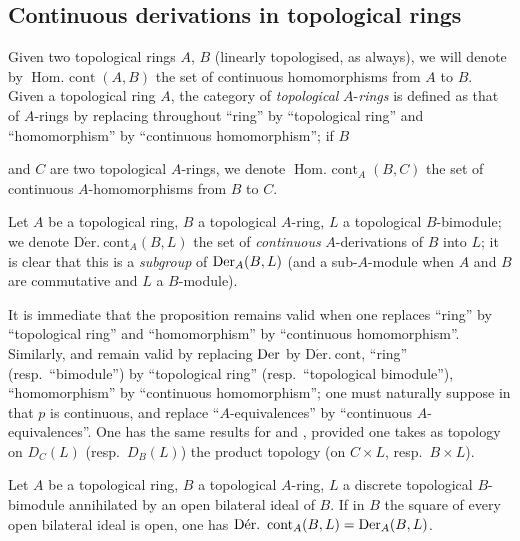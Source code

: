 \subsection{Continuous derivations in topological rings}
\label{subsection:0.20.3}

\begin{env}[20.3.1]
\label{0.20.3.1}
Given two topological rings $A$, $B$ (linearly topologised, as always), we will denote by $\operatorname{Hom.\ cont}(A,B)$ the set of continuous homomorphisms from $A$ to $B$.
Given a topological ring $A$, the category of \emph{topological} $A$-\emph{rings} is defined as that of $A$-rings  by replacing throughout ``ring'' by ``topological ring'' and ``homomorphism'' by ``continuous homomorphism''; if $B$

and $C$ are two topological $A$-rings, we denote $\operatorname{Hom.\ cont}_A(B,C)$ the set of continuous $A$-homomorphisms from $B$ to $C$.

Let $A$ be a topological ring, $B$ a topological $A$-ring, $L$ a topological $B$-bimodule; we denote $\operatorname{D\acute{e}r.\ cont}_A(B,L)$ the set of \emph{continuous} $A$-derivations of $B$ into $L$; it is clear that this is a \emph{subgroup} of $\operatorname{Der}_A(B,L)$ (and a sub-$A$-module when $A$ and $B$ are commutative and $L$ a $B$-module).
\end{env}

\begin{env}[20.3.2]
\label{0.20.3.2}
It is immediate that the proposition  remains valid when one replaces ``ring'' by ``topological ring'' and ``homomorphism'' by ``continuous homomorphism''.
Similarly,  and  remain valid by replacing $\operatorname{Der}$ by $\operatorname{D\acute{e}r.\ cont}$, ``ring'' (resp.\ ``bimodule'') by ``topological ring'' (resp.\ ``topological bimodule''), ``homomorphism'' by ``continuous homomorphism''; one must naturally suppose in  that $p$ is continuous, and replace ``$A$-equivalences'' by ``continuous $A$-equivalences''.
One has the same results for  and , provided one takes as topology on $D_C(L)$ (resp.\ $D_B(L)$) the product topology (on $C\times L$, resp.\ $B\times L$).
\end{env}

\begin{proposition}[20.3.3]
\label{0.20.3.3}
Let $A$ be a topological ring, $B$ a topological $A$-ring, $L$ a discrete topological $B$-bimodule annihilated by an open bilateral ideal of $B$.
If in $B$ the square of every open bilateral ideal is open, one has $\operatorname{D\acute{e}r.\ cont}_A(B,L)=\Der_A(B,L)$.
\end{proposition}


